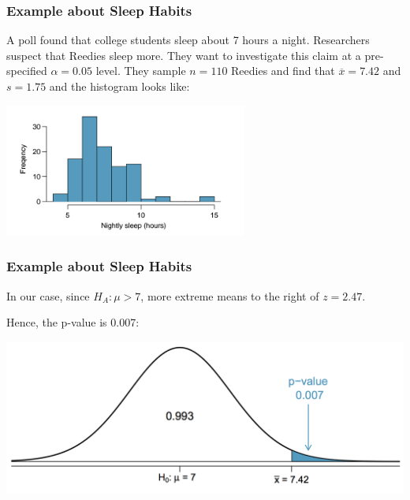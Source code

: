 \documentclass[handout]{beamer}
\newcommand{\blue}[1]{\textcolor{blue2}{#1}}
\newcommand{\xbar}{\overline{x}}
\begin{document}
\begin{frame}
\frametitle{Example about Sleep Habits}
A poll found that college students sleep about 7 hours a night.  Researchers suspect that Reedies sleep more.   They want to investigate this claim at a pre-specified $\alpha=0.05$ level.  \pause They sample $n=110$ Reedies and find that $\xbar = 7.42$ and $s=1.75$ and the histogram looks like:

\begin{center}
\includegraphics[width=0.6\textwidth]{figure/sleep.png}
\end{center}



%

\end{frame}


\begin{frame}
\frametitle{Example about Sleep Habits}
In our case, since $H_A: \mu > 7$, \blue{more extreme} means \blue{to the right} of $z=2.47$.  

\vspace{0.5cm}

Hence, the p-value is 0.007:

\begin{center}
\includegraphics[width=\textwidth]{figure/pvalue.png}
\end{center}

\end{frame}
\end{document}
